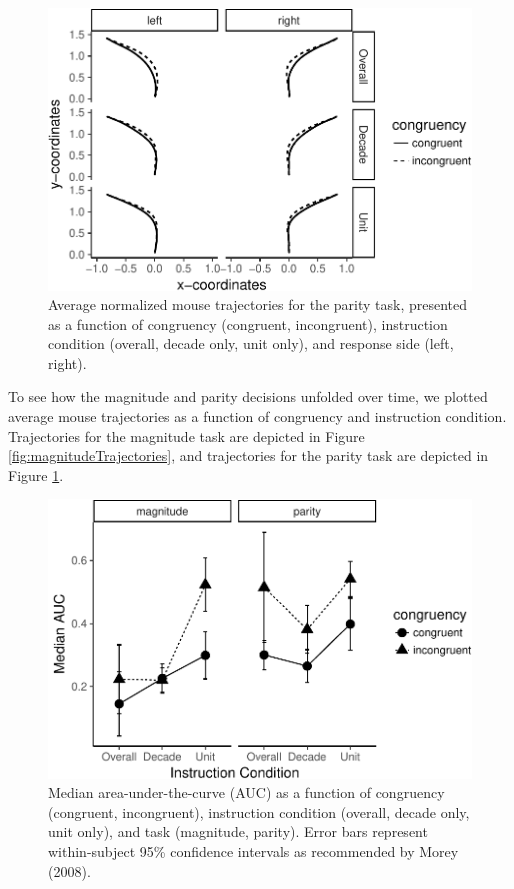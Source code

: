 \documentclass[english,man]{apa6}
\theoremstyle{definition}
\theoremstyle{definition}
\theoremstyle{definition}
\theoremstyle{remark}
\begin{document}
\begin{figure}
\centering
\includegraphics{paper_files/figure-latex/parityTrajectories-1.pdf}
\caption{\label{fig:parityTrajectories}Average normalized mouse trajectories
for the parity task, presented as a function of congruency (congruent,
incongruent), instruction condition (overall, decade only, unit only),
and response side (left, right).}
\end{figure}

To see how the magnitude and parity decisions unfolded over time, we
plotted average mouse trajectories as a function of congruency and
instruction condition. Trajectories for the magnitude task are depicted
in Figure \ref{fig:magnitudeTrajectories}, and trajectories for the
parity task are depicted in Figure \ref{fig:parityTrajectories}.

\begin{figure}
\centering
\includegraphics{paper_files/figure-latex/exp2-auc-1.pdf}
\caption{\label{fig:exp2-auc}Median area-under-the-curve (AUC) as a function
of congruency (congruent, incongruent), instruction condition (overall,
decade only, unit only), and task (magnitude, parity). Error bars
represent within-subject 95\% confidence intervals as recommended by
Morey (2008).}
\end{figure}
\end{document}
